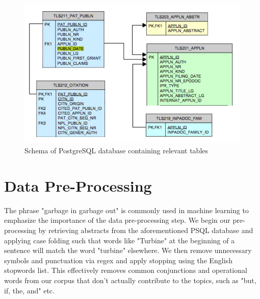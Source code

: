 \begin{figure}[h]
\centering
\includegraphics[width=130mm,scale=0.45]{Figures/psql_schema}
\decoRule
\caption[PSQLSchema]{Schema of PostgreSQL database containing relevant tables}
\label{fig:psqlSchema}
\end{figure}



\section{Data Pre-Processing}

The phrase "garbage in garbage out" is commonly used in machine learning to emphasize the importance of the data pre-processing step. We begin our pre-processing by retrieving abstracts from the aforementioned PSQL database and applying case folding such that words like "Turbine" at the beginning of a sentence will match the word "turbine" elsewhere. We then remove unnecessary symbols and punctuation via regex and apply stopping using the English  stopwords list. This effectively removes common conjunctions and operational words from our corpus that don't actually contribute to the topics, such as "but, if, the, and" etc. 

